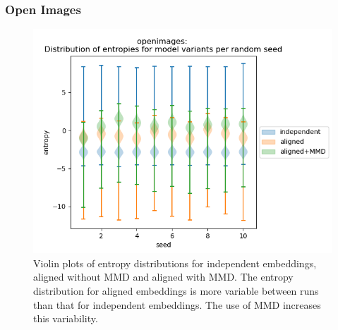 \subsubsection{Open Images}





\begin{figure}[H]
    \centering
    \includegraphics[width=\textwidth]{images/results/openimages_entropies_violin.png}
    \caption{
        Violin plots of entropy distributions for independent embeddings, aligned without MMD and aligned with MMD. The entropy distribution for aligned embeddings is more variable between runs than that for independent embeddings. The use of MMD increases this variability. 
    }
\end{figure}

